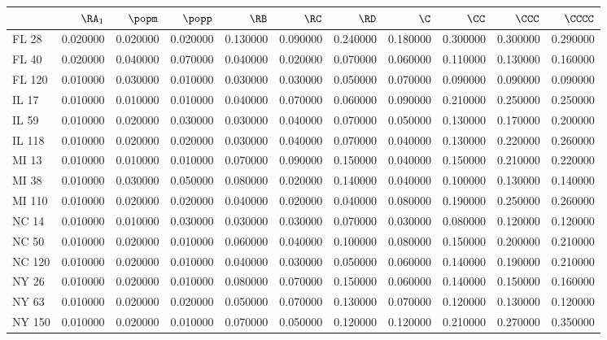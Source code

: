 \begin{tabular}{lrrrrrrrrrr}
\toprule
 & $\RA_1$ & $\popm$ & $\popp$ & $\RB$ & $\RC$ & $\RD$ & $\C$ & $\CC$ & $\CCC$ & $\CCCC$ \\
\midrule
FL 28 & 0.020000 & 0.020000 & 0.020000 & 0.130000 & 0.090000 & 0.240000 & 0.180000 & 0.300000 & 0.300000 & 0.290000 \\
FL 40 & 0.020000 & 0.040000 & 0.070000 & 0.040000 & 0.020000 & 0.070000 & 0.060000 & 0.110000 & 0.130000 & 0.160000 \\
FL 120 & 0.010000 & 0.030000 & 0.010000 & 0.030000 & 0.030000 & 0.050000 & 0.070000 & 0.090000 & 0.090000 & 0.090000 \\
IL 17 & 0.010000 & 0.010000 & 0.010000 & 0.040000 & 0.070000 & 0.060000 & 0.090000 & 0.210000 & 0.250000 & 0.250000 \\
IL 59 & 0.010000 & 0.020000 & 0.030000 & 0.030000 & 0.040000 & 0.070000 & 0.050000 & 0.130000 & 0.170000 & 0.200000 \\
IL 118 & 0.010000 & 0.020000 & 0.020000 & 0.030000 & 0.040000 & 0.070000 & 0.040000 & 0.130000 & 0.220000 & 0.260000 \\
MI 13 & 0.010000 & 0.010000 & 0.010000 & 0.070000 & 0.090000 & 0.150000 & 0.040000 & 0.150000 & 0.210000 & 0.220000 \\
MI 38 & 0.010000 & 0.030000 & 0.050000 & 0.080000 & 0.020000 & 0.140000 & 0.040000 & 0.100000 & 0.130000 & 0.140000 \\
MI 110 & 0.010000 & 0.020000 & 0.020000 & 0.040000 & 0.020000 & 0.040000 & 0.080000 & 0.190000 & 0.250000 & 0.260000 \\
NC 14 & 0.010000 & 0.010000 & 0.030000 & 0.030000 & 0.030000 & 0.070000 & 0.030000 & 0.080000 & 0.120000 & 0.120000 \\
NC 50 & 0.010000 & 0.020000 & 0.010000 & 0.060000 & 0.040000 & 0.100000 & 0.080000 & 0.150000 & 0.200000 & 0.210000 \\
NC 120 & 0.010000 & 0.020000 & 0.010000 & 0.040000 & 0.030000 & 0.050000 & 0.060000 & 0.140000 & 0.190000 & 0.210000 \\
NY 26 & 0.010000 & 0.020000 & 0.010000 & 0.080000 & 0.070000 & 0.150000 & 0.060000 & 0.140000 & 0.150000 & 0.160000 \\
NY 63 & 0.010000 & 0.020000 & 0.020000 & 0.050000 & 0.070000 & 0.130000 & 0.070000 & 0.120000 & 0.130000 & 0.120000 \\
NY 150 & 0.010000 & 0.020000 & 0.010000 & 0.070000 & 0.050000 & 0.120000 & 0.120000 & 0.210000 & 0.270000 & 0.350000 \\

\end{tabular}

